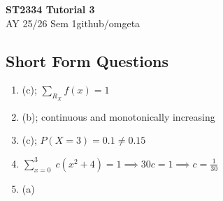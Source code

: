 \documentclass[12pt, a4paper]{article}
\newcommand{\mytitle}{ST2334 Tutorial 3}
\newcommand{\myauthor}{github/omgeta}
\newcommand{\mydate}{AY 25/26 Sem 1}
\begin{document}
\raggedright
\footnotesize
\begin{center}
{\normalsize{\textbf{\mytitle}}} \\
{\footnotesize{\mydate\hspace{2pt}\textemdash\hspace{2pt}\myauthor}}
\end{center}
\subsection*{Short Form Questions}
\begin{enumerate}[Q\arabic*.]
  \item (c); $\sum_{R_X} f(x) = 1$

  \item (b); continuous and monotonically increasing

  \item (c); $P(X=3) = 0.1 \neq 0.15$

  \item $\sum_{x=0}^3\;c(x^2+4) = 1 \implies 30c = 1 \implies c= \frac{1}{30}$

  \item (a)
\end{enumerate}
\end{document}
